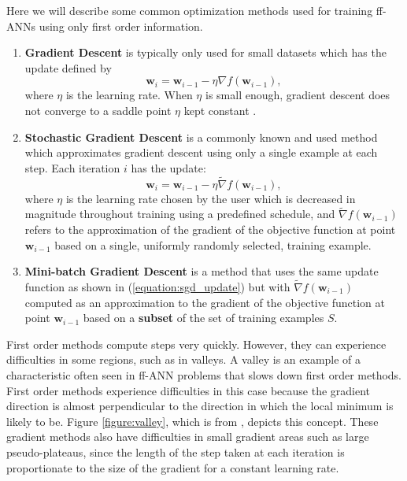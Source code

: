 \documentclass[letterpaper,12pt,titlepage,oneside,final]{book}
\begin{document}
	Here we will describe some common optimization methods used for training ff-ANNs using only first order information. 
	\begin{enumerate}
		\item {\textbf{Gradient Descent} is typically only used for small datasets which has the update defined by 
			\begin{equation}
			\mathbf{w}_{i} = \mathbf{w}_{i-1} - \eta{\nabla}{f(\mathbf{w}_{i-1})},
			\label{equation:gd_update}
			\end{equation}
			where $\eta$ is the learning rate. When $\eta$ is small enough, gradient descent does not converge to a saddle point $\eta$ kept constant \cite{gd_converges.paper}.
		}
		\item{\textbf{Stochastic Gradient Descent} is a commonly known and used method which approximates gradient descent using only a single example at each step. Each iteration $i$ has the update:
			\begin{equation}
			\mathbf{w}_{i} = \mathbf{w}_{i-1} - \eta\widetilde{\nabla}{f(\mathbf{w}_{i-1})},
			\label{equation:sgd_update}
			\end{equation}
			where $\eta$ is the learning rate chosen by the user which is decreased in magnitude throughout training using a predefined schedule, and $\widetilde{\nabla}{f(\mathbf{w}_{i-1})}$ refers to the approximation of the gradient of the objective function at point $\mathbf{w}_{i-1}$ based on a single, uniformly randomly selected, training example. 
		}   
		\item{\textbf{Mini-batch Gradient Descent} is a method that uses the same update function as shown in (\ref{equation:sgd_update}) but with $\widetilde{\nabla}{f(\mathbf{w}_{i-1})}$ computed as an approximation to the gradient of the objective function at point $\mathbf{w}_{i-1}$ based on a \textbf{subset} of the set of training examples $S$.}
	\end{enumerate}
	First order methods compute steps very quickly. However, they can experience difficulties in some regions, such as in valleys. A valley is an example of a characteristic often seen in ff-ANN problems \cite{Shepherd.1997} that slows down first order methods. First order methods experience difficulties in this case because the gradient direction is almost perpendicular to the direction in which the local minimum is likely to be. Figure \ref{figure:valley}, which is from \cite{martens2010deep}, depicts this concept. These gradient methods also have difficulties in small gradient areas such as large pseudo-plateaus, since the length of the step taken at each iteration is proportionate to the size of the gradient for a constant learning rate.
	
\end{document}
